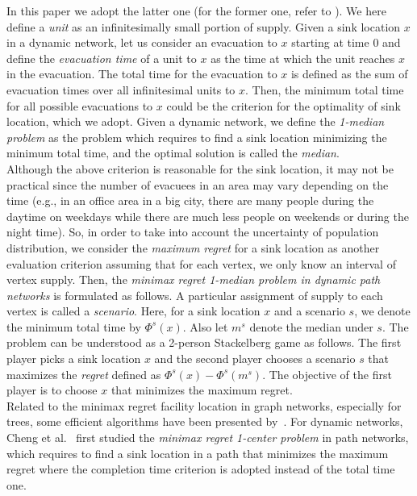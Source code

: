\documentclass[a4paper]{llncs}
\begin{document}
In this paper we adopt the latter one (for the former one, refer to \cite{h14,hgk14_2,hgk14_4,mumf06}).
We here define a {\it unit} as an infinitesimally small portion of supply.
Given a sink location $x$ in a dynamic network, let us consider an evacuation to $x$ starting at time $0$ 
and define the {\it evacuation time} of a unit to $x$ as the time at which the unit reaches $x$ in the evacuation.
The total time for the evacuation to $x$ is defined as the sum of evacuation times over all infinitesimal units to $x$.
Then, the minimum total time for all possible evacuations to $x$ could be the criterion for the optimality of sink location, which we adopt.
Given a dynamic network, we define the {\it 1-median problem} as the problem which requires to find a sink location minimizing the minimum total time, 
and the optimal solution is called the {\it median}.\\
\indent
Although the above criterion is reasonable for the sink location, it may not be practical since the number of evacuees in an area may vary depending on the time
(e.g., in an office area in a big city, there are many people during the daytime on weekdays while there are much less people on weekends or during the night time). 
So, in order to take into account the uncertainty of population distribution,
we consider the {\it maximum regret} for a sink location as another evaluation criterion assuming that for each vertex, we only know an interval of vertex supply. 
Then, the {\it minimax regret 1-median problem in dynamic path networks} is formulated as follows.
A particular assignment of supply to each vertex is called a {\it scenario}.
Here, for a sink location $x$ and a scenario $s$, we denote the minimum total time by $\Phi^s(x)$.
Also let $m^s$ denote the median under $s$.
The problem can be understood as a 2-person Stackelberg game as follows.
The first player picks a sink location $x$ and the second player chooses a scenario $s$ that maximizes the {\it regret} defined as $\Phi^s(x)-\Phi^s(m^s)$.
The objective of the first player is to choose $x$ that minimizes the maximum regret. \\
\indent
Related to the minimax regret facility location in graph networks, especially for trees, some efficient algorithms have been presented by~\cite{ab00,bk12,bks13,bgk08,cl98,c08}.
For dynamic networks, Cheng et al.~\cite{chknsx13} first studied the
{\it minimax regret 1-center problem} in path networks,
which requires to find a sink location in a path that minimizes the maximum regret where the completion time criterion is adopted instead of the total time one.
\end{document}
